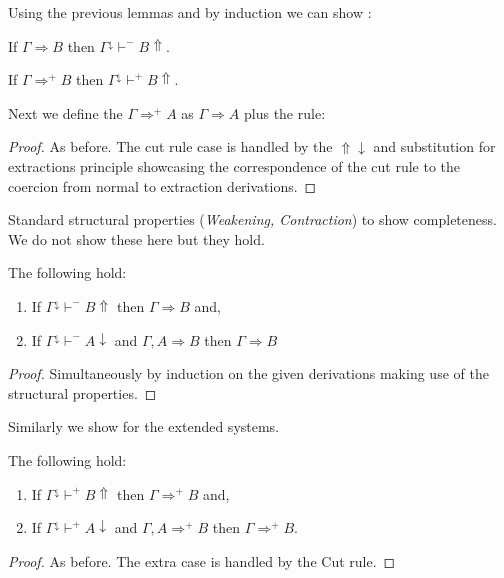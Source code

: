 Using the previous lemmas and by induction we can show :
\begin{theorem} 
	\label{soundnseq}
If   $\Gamma\Rightarrow B$ then $\Gamma^\downarrow\vdash^{-} B\Uparrow$.

	
\end{theorem}
\begin{theorem} 
	
	If   $\Gamma\Rightarrow^{+} B$ then $\Gamma^\downarrow\vdash^{+} B\Uparrow$.
\end{theorem}

Next we define the $\Gamma\Rightarrow^{+} A$ as $\Gamma\Rightarrow A$ plus the rule:
\begin{mathpar}
\end{mathpar}
\begin{proof}
As before. The cut rule case is handled by the $\Uparrow\downarrow$ and substitution for extractions principle showcasing  the correspondence of the cut rule to the coercion from normal to extraction derivations.
\end{proof}
Standard structural properties (\textit{Weakening, Contraction}) to show completeness. We do not show these here but they hold.
\begin{theorem} 
	\label{compseqcalc}
	The following hold:
	\begin{enumerate}
		\item If   $\Gamma^\downarrow\vdash^{-} B\Uparrow$ then $\Gamma\Rightarrow B$ and,
		\item 	If $\Gamma^\downarrow \vdash^{-} A\downarrow$ and $\Gamma,A\Rightarrow B$ then $\Gamma\Rightarrow B$   
	\end{enumerate}
\begin{proof}
	Simultaneously by induction on the given derivations making use of the structural properties.
\end{proof}
Similarly we show for the extended systems.
\begin{theorem} The following hold:
	\label{compseqcut}
	\begin{enumerate}
		\item If   $\Gamma^\downarrow\vdash^{+} B\Uparrow$ then  $\Gamma\Rightarrow^{+} B$ and,
		\item 	If $\Gamma^\downarrow \vdash^{+} A\downarrow$ and $\Gamma,A\Rightarrow^{+} B$ then $\Gamma\Rightarrow^{+} B$.   
	\end{enumerate}
\end{theorem}
\begin{proof}
	As before. The extra case is handled by the Cut rule.
\end{proof}
\end{theorem}
